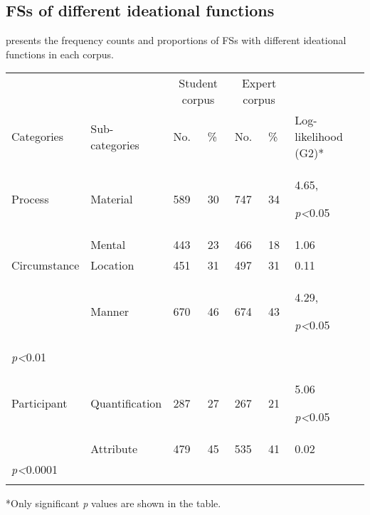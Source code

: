 \documentclass[output=paper]{langsci/langscibook}
\begin{document}
\subsection{FSs of different ideational functions} 

 presents the frequency counts and proportions of FSs with different ideational functions in each corpus.


\begin{tabularx}{\textwidth}{XXXXXXX} &  & \multicolumn{2}{c}{Student corpus} & \multicolumn{2}{c}{Expert corpus} & \\

\lsptoprule
Categories & Sub-categories & No. & \% & No. & \% & Log-likelihood (G2)*\\
Process & Material & 589 & 30 & 747 & 34 & 4.65, 

\textit{p<}0.05\\
& Mental & 443 & 23 & 466 & 18 & 1.06\\
Circumstance & Location & 451 & 31 & 497 & 31 & 0.11\\
& Manner & 670 & 46 & 674 & 43 & 4.29,

\textit{p<}0.05\\

\textit{p<}0.01\\
Participant & Quantification & 287 & 27 & 267 & 21 & 5.06

\textit{p<}0.05\\
& Attribute & 479 & 45 & 535 & 41 & 0.02\\

\textit{p<}0.0001\\
\lspbottomrule
\end{tabularx}
*Only significant \textit{p} values are shown in the table.
\end{document}
